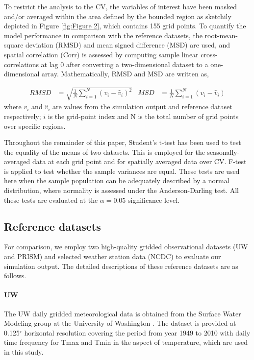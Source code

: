 \documentclass[draft,ms]{agutex}   %
\begin{document}
\begin{article}
To restrict the analysis to the CV, the variables of interest have been masked and/or averaged within the area defined by the bounded region as sketchily depicted in Figure \ref{fig:Figure 2}, which contains 155 grid points. To quantify the model performance in comparison with the reference datasets, the root-mean-square deviation (RMSD) and mean signed difference (MSD) are used, and spatial correlation (Corr) is assessed by computing sample linear cross-correlations at lag 0 after converting a two-dimensional dataset to a one-dimensional array. Mathematically, RMSD and MSD are written as, 

\begin{align}
RMSD &= \sqrt{\frac{1}{N} \sum_{i=1}^{N} (v_i - \hat{v}_i)^2}  & MSD &= \frac{1}{N} \sum_{i=1}^{N} (v_i - \hat{v}_i) 
\end{align} where $v_i$ and $\hat{v}_i$ are values from the simulation output and reference dataset respectively; $i$ is the grid-point index and N is the total number of grid points over specific regions.

Throughout the remainder of this paper, Student's t-test has been used to test the equality of the means of two datasets. This is employed for the seasonally-averaged data at each grid point and for spatially averaged data over CV. F-test is applied to test whether the sample variances are equal. These tests are used here when the sample population can be adequately described by a normal distribution, where normality is assessed under the Anderson-Darling test. All these tests are evaluated at the $\alpha = 0.05$ significance level. 

\subsection{Reference datasets}

For comparison, we employ two high-quality gridded observational datasets (UW and PRISM) and selected weather station data (NCDC) to evaluate our simulation output. The detailed descriptions of these reference datasets are as follows.

\paragraph{UW} The UW daily gridded meteorological data is obtained from the Surface Water Modeling group at the University of Washington \citep{maurer2002long, hamlet2005production}. The dataset is provided at 0.125$^\circ$ horizontal resolution covering the period from year 1949 to 2010 with daily time frequency for Tmax and Tmin in the aspect of temperature, which are used in this study.


\end{article}
\end{document}
